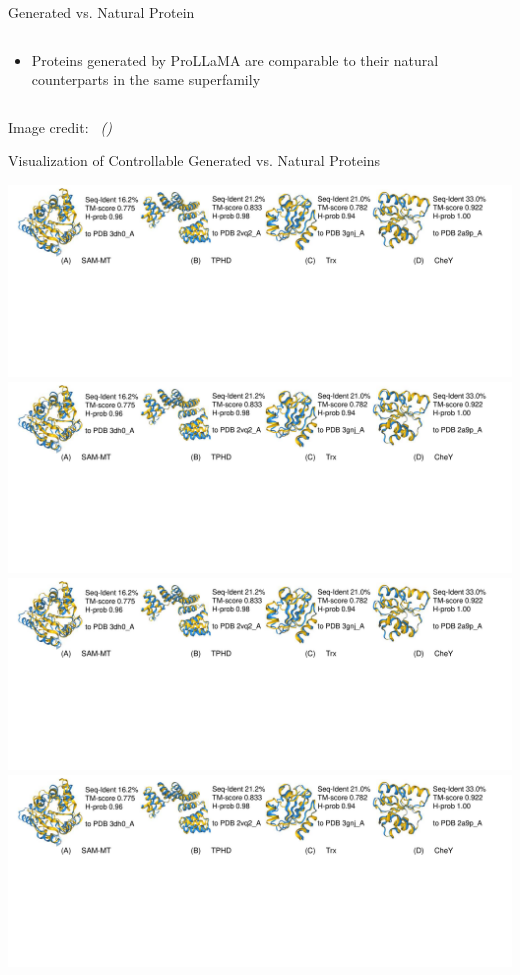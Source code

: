 \documentclass[dvipsnames,
hyperref={citecolor=blue}
]{beamer}
\newcommand{\credit}[2]{{\par\hfill \tiny #1 credit:~\itshape{\color{blue} \citeauthor{#2} (\citeyear{#2})}}}
\begin{document}
\begin{frame}{Generated vs. Natural Protein}
\begin{columns}
\begin{column}{0.5\textwidth}
			\begin{itemize}
				\item Proteins generated by ProLLaMA are comparable to their
				natural counterparts in the same superfamily
			\end{itemize}
		\end{column}
	\end{columns}
	\credit{Image}{lv2024prollama}
\end{frame}

\begin{frame}{Visualization of Controllable Generated vs. Natural Proteins}
	\begin{center}
		\includegraphics[trim={0 0 90em 0},clip,scale=0.4]{images/protein_visualization.pdf}
		\includegraphics[trim={31.5em 0 57.4em 0},clip,scale=0.4]{images/protein_visualization.pdf}
		\includegraphics[trim={64em 0 30em 0},clip,scale=0.4]{images/protein_visualization.pdf}
		\includegraphics[trim={92em 0 0 0},clip,scale=0.4]{images/protein_visualization.pdf}

\end{center}
\end{frame}
\end{document}
